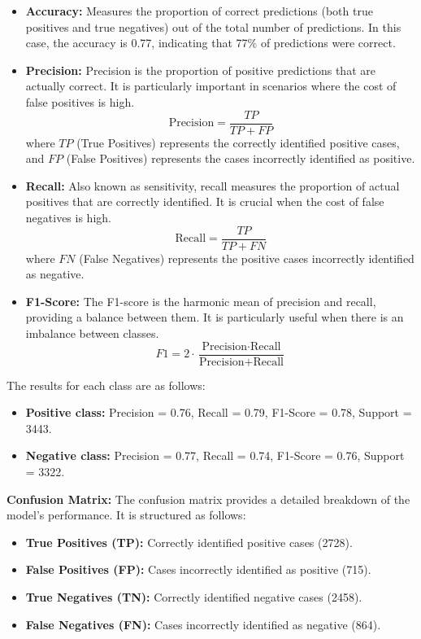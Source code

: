 \documentclass[a4paper,40pt,twocolumn]{article}
\begin{document}
\begin{itemize}
    \item \textbf{Accuracy:} Measures the proportion of correct predictions (both true positives and true negatives) out of the total number of predictions. In this case, the accuracy is 0.77, indicating that 77\% of predictions were correct.
    
    \item \textbf{Precision:} Precision is the proportion of positive predictions that are actually correct. It is particularly important in scenarios where the cost of false positives is high.
    \[
    \text{Precision} = \frac{TP}{TP + FP}
    \]
    where $TP$ (True Positives) represents the correctly identified positive cases, and $FP$ (False Positives) represents the cases incorrectly identified as positive.
    
    \item \textbf{Recall:} Also known as sensitivity, recall measures the proportion of actual positives that are correctly identified. It is crucial when the cost of false negatives is high.
    \[
    \text{Recall} = \frac{TP}{TP + FN}
    \]
    where $FN$ (False Negatives) represents the positive cases incorrectly identified as negative.
    
    \item \textbf{F1-Score:} The F1-score is the harmonic mean of precision and recall, providing a balance between them. It is particularly useful when there is an imbalance between classes.
    \[
    F1 = 2 \cdot \frac{\text{Precision} \cdot \text{Recall}}{\text{Precision} + \text{Recall}}
    \]
\end{itemize}

The results for each class are as follows:
\begin{itemize}
    \item \textbf{Positive class:} Precision = 0.76, Recall = 0.79, F1-Score = 0.78, Support = 3443.
    \item \textbf{Negative class:} Precision = 0.77, Recall = 0.74, F1-Score = 0.76, Support = 3322.
\end{itemize}

\textbf{Confusion Matrix:}
The confusion matrix provides a detailed breakdown of the model's performance. It is structured as follows:
\begin{itemize}
    \item \textbf{True Positives (TP):} Correctly identified positive cases (2728).
    \item \textbf{False Positives (FP):} Cases incorrectly identified as positive (715).
    \item \textbf{True Negatives (TN):} Correctly identified negative cases (2458).
    \item \textbf{False Negatives (FN):} Cases incorrectly identified as negative (864).
\end{itemize}
\end{document}
